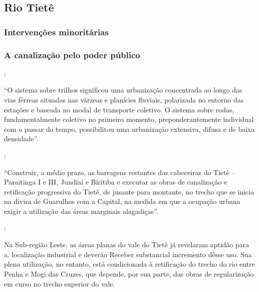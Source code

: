 \documentclass[
article,			%
11pt,				%
oneside,			%
a4paper,			%
english,			%
brazil,				%
sumario=tradicional
]{abntex2}
\begin{document}
	\subsection{Rio Tietê} \label{s2:riotiete}
	
	\subsubsection{Intervenções minoritárias} \label{s3:minoritariastiete}
	
	\subsubsection{A canalização pelo poder público} \label{s3:canalizacaopub}
	
	:
	
	\begin{citacao}
		``O sistema sobre trilhos significou uma urbanização concentrada ao longo das vias férreas situadas nas várzeas e planícies fluviais, polarizada no entorno das estações e baseada no modal de transporte coletivo. O sistema sobre rodas, fundamentalmente coletivo no primeiro momento, preponderantemente individual com o passar do tempo, possibilitou uma urbanização extensiva, difusa e de baixa densidade''.
	\end{citacao}
	
	:
	
	\begin{citacao}
		``Construir, a médio prazo, as barragens restantes das cabeceiras do Tietê -- Paraitinga I e III, Jundiaí e Biritiba e executar as obras de canalização e retificação progressiva do Tietê, de jusante para montante, no trecho que se inicia na divisa de Guarulhos com a Capital, na medida em que a ocupação urbana exigir a utilização das áreas marginais alagadiças''.
	\end{citacao}
	
	:
		
	\begin{citacao}
		Na Sub-região Leste. as áreas planas do vale do Tietê já revelaram aptidão para a. localização industrial e deverão Receber substancial incremento dêsse uso. Sua plena utilização, no entanto, está condicionada à retificação do trecho do rio entre Penha e Mogi das Cruzes, que depende, por sua parte, das obras de regularização em curso no trecho superior do vale.
	\end{citacao}
	
\end{document}
